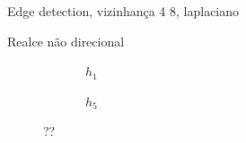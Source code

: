 
Edge detection, vizinhança 4 8, laplaciano

Realce não direcional %

\begin{figure}[H]
    \centering
    \begin{subfigure}{0.4\textwidth}
        \centering
        
        \caption{~$h_1$}
        \label{fig:h1}
    \end{subfigure}%
    \begin{subfigure}{0.4\textwidth}
        \centering
        
        \caption{~$h_5$}
        \label{fig:h5}
    \end{subfigure}

    \caption{??}
\end{figure}

